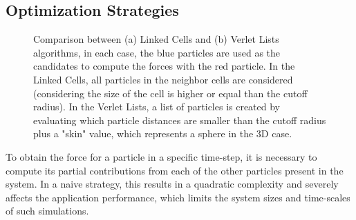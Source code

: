 \documentclass[preprint,12pt]{elsarticle}
\begin{document}
\subsection{Optimization Strategies}
\label{sec:opts}

\begin{figure}[htb]
    \centering
    \caption{Comparison between (a) Linked Cells and (b) Verlet Lists algorithms, in each case, the blue particles are used as the candidates to compute the forces with the red particle. In the Linked Cells, all particles in the neighbor cells are considered (considering the size of the cell is higher or equal than the cutoff radius). In the Verlet Lists, a list of particles is created by evaluating which particle distances are smaller than the cutoff radius plus a "skin" value, which represents a sphere in the 3D case.}
\end{figure}

To obtain the force for a particle in a specific time-step, it is necessary to compute its partial contributions from each of the other particles present in the system.
In a naive strategy, this results in a quadratic complexity and severely affects the application performance, which limits the system sizes and time-scales of such simulations.
\end{document}
